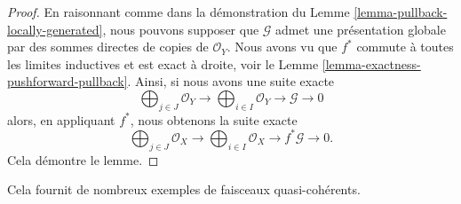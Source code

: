 \begin{proof}
En raisonnant comme dans la démonstration du Lemme
\ref{lemma-pullback-locally-generated}, nous pouvons supposer que
$\mathcal{G}$ admet une présentation globale par des sommes directes de copies
de $\mathcal{O}_Y$. Nous avons vu que $f^*$ commute à toutes les limites
inductives et est exact à droite, voir le Lemme
\ref{lemma-exactness-pushforward-pullback}. Ainsi, si nous avons une suite
exacte
$$
\bigoplus\nolimits_{j \in J}
\mathcal{O}_Y
\longrightarrow
\bigoplus\nolimits_{i \in I}
\mathcal{O}_Y
\longrightarrow
\mathcal{G}
\longrightarrow
0
$$
alors, en appliquant $f^*$, nous obtenons la suite exacte
$$
\bigoplus\nolimits_{j \in J}
\mathcal{O}_X
\longrightarrow
\bigoplus\nolimits_{i \in I}
\mathcal{O}_X
\longrightarrow
f^*\mathcal{G}
\longrightarrow
0.
$$
Cela démontre le lemme.
\end{proof}

\noindent
Cela fournit de nombreux exemples de faisceaux quasi-cohérents.

